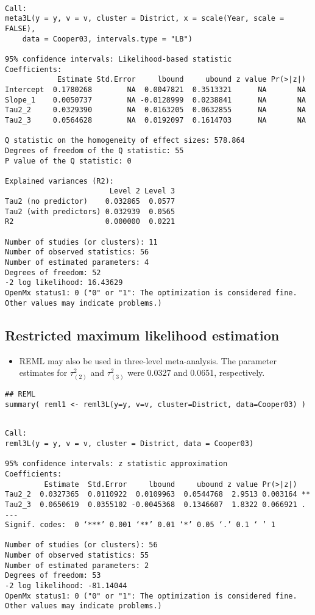 \documentclass[11pt]{article}
\begin{document}
\begin{verbatim}

Call:
meta3L(y = y, v = v, cluster = District, x = scale(Year, scale = FALSE), 
    data = Cooper03, intervals.type = "LB")

95% confidence intervals: Likelihood-based statistic
Coefficients:
            Estimate Std.Error     lbound     ubound z value Pr(>|z|)
Intercept  0.1780268        NA  0.0047821  0.3513321      NA       NA
Slope_1    0.0050737        NA -0.0128999  0.0238841      NA       NA
Tau2_2     0.0329390        NA  0.0163205  0.0632855      NA       NA
Tau2_3     0.0564628        NA  0.0192097  0.1614703      NA       NA

Q statistic on the homogeneity of effect sizes: 578.864
Degrees of freedom of the Q statistic: 55
P value of the Q statistic: 0

Explained variances (R2):
                        Level 2 Level 3
Tau2 (no predictor)    0.032865  0.0577
Tau2 (with predictors) 0.032939  0.0565
R2                     0.000000  0.0221

Number of studies (or clusters): 11
Number of observed statistics: 56
Number of estimated parameters: 4
Degrees of freedom: 52
-2 log likelihood: 16.43629 
OpenMx status1: 0 ("0" or "1": The optimization is considered fine.
Other values may indicate problems.)
\end{verbatim}

\subsection{Restricted maximum likelihood estimation}
\label{sec:orgdf5c79a}
\begin{itemize}
\item REML may also be used in three-level meta-analysis. The parameter estimates for \(\tau^2_{(2)}\) and \(\tau^2_{(3)}\) were 0.0327 and 0.0651, respectively.
\end{itemize}
\begin{verbatim}
## REML
summary( reml1 <- reml3L(y=y, v=v, cluster=District, data=Cooper03) )
\end{verbatim}

\begin{verbatim}

Call:
reml3L(y = y, v = v, cluster = District, data = Cooper03)

95% confidence intervals: z statistic approximation
Coefficients:
         Estimate  Std.Error     lbound     ubound z value Pr(>|z|)   
Tau2_2  0.0327365  0.0110922  0.0109963  0.0544768  2.9513 0.003164 **
Tau2_3  0.0650619  0.0355102 -0.0045368  0.1346607  1.8322 0.066921 . 
---
Signif. codes:  0 ‘***’ 0.001 ‘**’ 0.01 ‘*’ 0.05 ‘.’ 0.1 ‘ ’ 1

Number of studies (or clusters): 56
Number of observed statistics: 55
Number of estimated parameters: 2
Degrees of freedom: 53
-2 log likelihood: -81.14044 
OpenMx status1: 0 ("0" or "1": The optimization is considered fine.
Other values may indicate problems.)
\end{verbatim}
\end{document}

